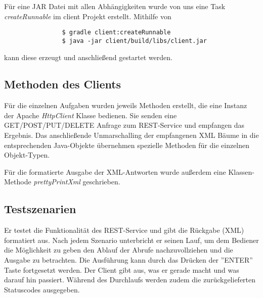 \documentclass[12pt]{scrartcl}
\begin{document}
			Für eine JAR Datei mit allen Abhängigkeiten wurde von uns eine Task \emph{createRunnable} im client Projekt erstellt. Mithilfe von
			\begin{verbatim}
				$ gradle client:createRunnable
				$ java -jar client/build/libs/client.jar
			\end{verbatim}
			
			kann diese erzeugt und anschließend gestartet werden.
		\subsection{Methoden des Clients}
		
			Für die einzelnen Aufgaben wurden jeweils Methoden erstellt, die eine Instanz der Apache \emph{HttpClient} Klasse bedienen. Sie senden eine GET/POST/PUT/DELETE Anfrage zum REST-Service und empfangen das Ergebnis. Das anschließende Unmarschalling der empfangenen XML Bäume in die entsprechenden Java-Objekte übernehmen spezielle Methoden für die einzelnen Objekt-Typen.
			
			Für die formatierte Ausgabe der XML-Antworten wurde außerdem eine Klassen-Methode \emph{prettyPrintXml} geschrieben.
		
		
		\subsection{Testszenarien}
			
			Er testet die Funktionalität des REST-Service und gibt die Rückgabe (XML) formatiert aus. Nach jedem Szenario unterbricht er seinen Lauf, um dem Bediener die Möglichkeit zu geben den Ablauf der Abrufe nachzuvollziehen und die Ausgabe zu betrachten. Die Ausführung kann durch das Drücken der ''ENTER'' Taste fortgesetzt werden. Der Client gibt aus, was er gerade macht und was darauf hin passiert. Während des Durchlaufs werden zudem die zurückgelieferten Statuscodes ausgegeben.
			
\end{document}
